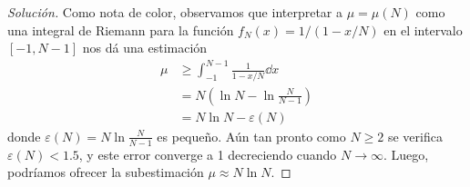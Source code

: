 \documentclass{article}
\theoremstyle{definition}
\begin{document}
\begin{proof}[Solución]
Como nota de color, observamos que interpretar a $\mu = \mu(N)$ como una integral de Riemann para la función $f_N(x) = 1 / (1 - x / N)$ en el intervalo $[- 1, N - 1]$ nos dá una estimación
\begin{align}
    \mu
    &\geq
    \int_{- 1}^{N - 1} \frac{1}{1 - x / N} \dd x
    \\
    &=
    N \left(\ln N - \ln \frac{N}{N - 1}\right)
    \\
    &=
    N \ln N - \varepsilon(N)
\end{align}
donde $\varepsilon(N) = N \ln \frac{N}{N - 1}$ es pequeño.
Aún tan pronto como $N \geq 2$ se verifica $\varepsilon(N) < 1.5$, y este error converge a 1 decreciendo cuando $N \rightarrow \infty$.
Luego, podríamos ofrecer la subestimación $\mu \approx N \ln N$.
\end{proof}

\end{document}
